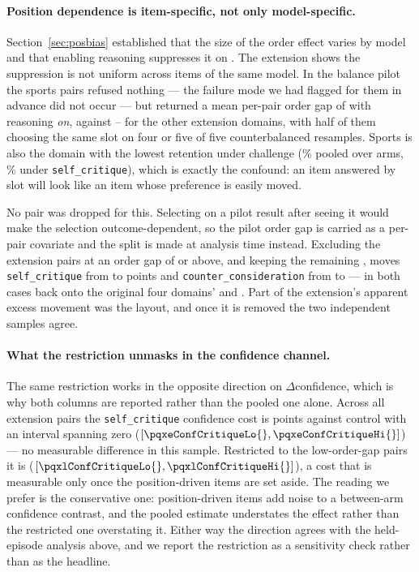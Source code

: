 \paragraph{Position dependence is item-specific, not only model-specific.}
Section~\ref{sec:posbias} established that the size of the order effect varies by model
and that enabling reasoning suppresses it on \pairModel{}. The extension shows the
suppression is not uniform across items of the same model. In the balance pilot the
sports pairs refused nothing --- the failure mode we had flagged for them in advance did
not occur --- but returned a mean per-pair order gap of \pqxSportsBias{} with reasoning
\emph{on}, against \pqxOtherBiasLo{}--\pqxOtherBiasHi{} for the other extension
domains, with half of them choosing the same slot on four or five of five counterbalanced
resamples. Sports is also the domain with the lowest retention under challenge
(\pqxSportsRet{}\% pooled over arms, \pqxSportsRetCritique{}\% under
\texttt{self\_critique}), which is exactly the confound: an item answered by slot will
look like an item whose preference is easily moved.

No pair was dropped for this. Selecting on a pilot result after seeing it would make the
selection outcome-dependent, so the pilot order gap is carried as a per-pair covariate and
the split is made at analysis time instead. Excluding the \pqxBiasDropPairs{} extension
pairs at an order gap of \pqxBiasCut{} or above, and keeping the remaining
\pqxBiasKeepPairs{}, moves \texttt{self\_critique} from \pqxeDiffCritique{} to
\pqxlDiffCritique{} points and \texttt{counter\_consideration} from \pqxeDiffCounter{} to
\pqxlDiffCounter{} --- in both cases back onto the original four domains'
\pqxoDiffCritique{} and \pqxoDiffCounter{}. Part of the extension's apparent excess
movement was the layout, and once it is removed the two independent samples agree.

\paragraph{What the restriction unmasks in the confidence channel.}
The same restriction works in the opposite direction on $\Delta$confidence, which is why
both columns are reported rather than the pooled one alone. Across all extension pairs
the \texttt{self\_critique} confidence cost is \pqxeConfCritique{} points against control
with an interval spanning zero (\([\pqxeConfCritiqueLo{}, \pqxeConfCritiqueHi{}]\)) --- no
measurable difference in this sample. Restricted to the low-order-gap pairs it is
\pqxlConfCritique{} (\([\pqxlConfCritiqueLo{}, \pqxlConfCritiqueHi{}]\)), a cost that is
measurable only once the position-driven items are set aside. The reading we prefer is
the conservative one: position-driven items add noise to a between-arm confidence
contrast, and the pooled estimate understates the effect rather than the restricted one
overstating it. Either way the direction agrees with the held-episode analysis above, and
we report the restriction as a sensitivity check rather than as the headline.

